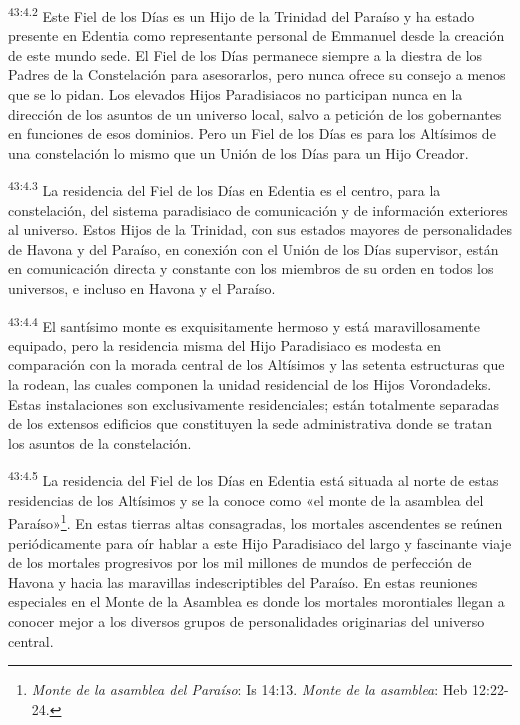 \par
\textsuperscript{43:4.2} Este Fiel de los Días es un Hijo de la Trinidad del Paraíso y ha estado presente en Edentia como representante personal de Emmanuel desde la creación de este mundo sede. El Fiel de los Días permanece siempre a la diestra de los Padres de la Constelación para asesorarlos, pero nunca ofrece su consejo a menos que se lo pidan. Los elevados Hijos Paradisiacos no participan nunca en la dirección de los asuntos de un universo local, salvo a petición de los gobernantes en funciones de esos dominios. Pero un Fiel de los Días es para los Altísimos de una constelación lo mismo que un Unión de los Días para un Hijo Creador.

\par
\textsuperscript{43:4.3} La residencia del Fiel de los Días en Edentia es el centro, para la constelación, del sistema paradisiaco de comunicación y de información exteriores al universo. Estos Hijos de la Trinidad, con sus estados mayores de personalidades de Havona y del Paraíso, en conexión con el Unión de los Días supervisor, están en comunicación directa y constante con los miembros de su orden en todos los universos, e incluso en Havona y el Paraíso.

\par
\textsuperscript{43:4.4} El santísimo monte es exquisitamente hermoso y está maravillosamente equipado, pero la residencia misma del Hijo Paradisiaco es modesta en comparación con la morada central de los Altísimos y las setenta estructuras que la rodean, las cuales componen la unidad residencial de los Hijos Vorondadeks. Estas instalaciones son exclusivamente residenciales; están totalmente separadas de los extensos edificios que constituyen la sede administrativa donde se tratan los asuntos de la constelación.

\par
\textsuperscript{43:4.5} La residencia del Fiel de los Días en Edentia está situada al norte de estas residencias de los Altísimos y se la conoce como «el monte de la asamblea del Paraíso»\footnote{\textit{Monte de la asamblea del Paraíso}: Is 14:13. \textit{Monte de la asamblea}: Heb 12:22-24.}. En estas tierras altas consagradas, los mortales ascendentes se reúnen periódicamente para oír hablar a este Hijo Paradisiaco del largo y fascinante viaje de los mortales progresivos por los mil millones de mundos de perfección de Havona y hacia las maravillas indescriptibles del Paraíso. En estas reuniones especiales en el Monte de la Asamblea es donde los mortales morontiales llegan a conocer mejor a los diversos grupos de personalidades originarias del universo central.

